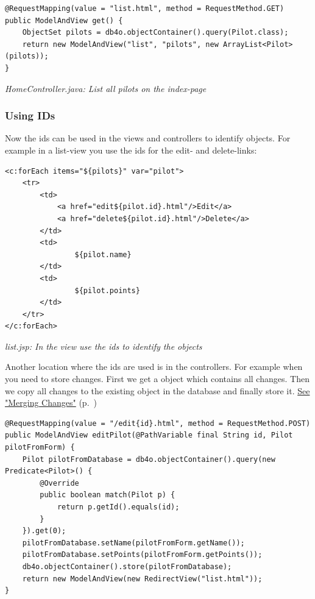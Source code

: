 \begin{lstlisting}
@RequestMapping(value = "list.html", method = RequestMethod.GET)
public ModelAndView get() {
    ObjectSet pilots = db4o.objectContainer().query(Pilot.class);
    return new ModelAndView("list", "pilots", new ArrayList<Pilot>(pilots));
}
\end{lstlisting}

{\small\itshape HomeController.java: List all pilots on the index-page\par}
\medskip

\subsubsection*{Using IDs}

Now the ids can be used in the views and controllers to identify objects. For example in a list-view you use the ids for the edit- and delete-links:

\begin{lstlisting}
<c:forEach items="${pilots}" var="pilot">
    <tr>
        <td>
            <a href="edit${pilot.id}.html"/>Edit</a>
            <a href="delete${pilot.id}.html"/>Delete</a>
        </td>
        <td>
                ${pilot.name}
        </td>
        <td>
                ${pilot.points}
        </td>
    </tr>
</c:forEach>
\end{lstlisting}

{\small\itshape list.jsp: In the view use the ids to identify the objects\par}
\medskip

Another location where the ids are used is in the controllers. For example when you need to store changes. First we get a object which contains all changes. Then we copy all changes to the existing object in the database and finally store it. \hyperref[ref:platform-specific-issues-disconnected-objects-merging-changes]{See "Merging Changes"} (p.~\pageref{ref:platform-specific-issues-disconnected-objects-merging-changes})

\begin{lstlisting}
@RequestMapping(value = "/edit{id}.html", method = RequestMethod.POST)
public ModelAndView editPilot(@PathVariable final String id, Pilot pilotFromForm) {
    Pilot pilotFromDatabase = db4o.objectContainer().query(new Predicate<Pilot>() {
        @Override
        public boolean match(Pilot p) {
            return p.getId().equals(id);
        }
    }).get(0);
    pilotFromDatabase.setName(pilotFromForm.getName());
    pilotFromDatabase.setPoints(pilotFromForm.getPoints());
    db4o.objectContainer().store(pilotFromDatabase);
    return new ModelAndView(new RedirectView("list.html"));
}
\end{lstlisting}

